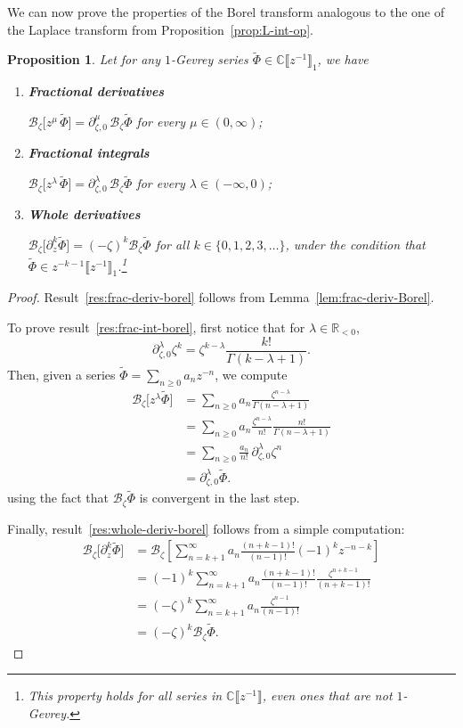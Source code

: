 \documentclass{article}
\newcommand{\R}{\mathbb{R}}
\newcommand{\C}{\mathbb{C}}
\newcommand{\series}[1]{\tilde{#1}}
\newcommand{\fracderiv}[3]{\partial^{#1}_{#2, #3}}
\newcommand{\borel}{\mathcal{B}}
\theoremstyle{definition}
\theoremstyle{plain}
\newtheorem{prop}[definition]{Proposition}
\begin{document}
We can now prove the properties of the Borel transform analogous to the one of the Laplace transform from Proposition~\ref{prop:L-int-op}.
\begin{prop}\label{prop:frac-der-int-borel}
Let for any $1$-Gevrey series $\series{\Phi}\in\C\llbracket z^{-1}\rrbracket_1$, we have
\begin{enumerate}[label=(\roman*)]
\item\label{res:frac-deriv-borel} \textbf{Fractional derivatives}

$\borel_\zeta\big[ z^\mu \, \series{\Phi}\big]=\fracderiv{\mu}{\zeta}{0}\, \borel_\zeta\series{\Phi}$ for every $\mu\in(0, \infty)$;
\item\label{res:frac-int-borel} \textbf{Fractional integrals}

$\borel_\zeta\big[z^\lambda\, \series{\Phi}\big]=\fracderiv{\lambda}{\zeta}{0}\,\borel_\zeta\series{\Phi}$ for every $\lambda\in(-\infty, 0)$;
\item\label{res:whole-deriv-borel} \textbf{Whole derivatives}

$\borel_\zeta\big[\partial_z^{k} \series{\Phi}\big]=(-\zeta)^k\borel_\zeta\series{\Phi}$ for all $k\in\{0, 1, 2, 3, \ldots\}$, under the condition that $\series{\Phi}\in z^{-k-1}\llbracket z^{-1}\rrbracket_1$.\footnote{This property holds for all series in $\C\llbracket z^{-1}\rrbracket$, even ones that are not $1$-Gevrey.}
\end{enumerate} 
\end{prop}
\begin{proof} 
Result~\ref{res:frac-deriv-borel} follows from Lemma~\ref{lem:frac-deriv-Borel}. 

To prove result~\ref{res:frac-int-borel}, first notice that for $\lambda \in \R_{< 0}$,
\[\fracderiv{\lambda}{\zeta}{0}\zeta^{k}=\zeta^{k-\lambda}\frac{k!}{\Gamma(k-\lambda+1)}.\] 
Then, given a series $\series{\Phi} = \sum_{n\geq 0} a_n z^{-n}$, we compute
\begin{align*}
\borel_\zeta \big[z^\lambda \series{\Phi}\big] & = \sum_{n\geq 0}a_n\frac{\zeta^{n-\lambda}}{\Gamma(n-\lambda+1)} \\
& = \sum_{n\geq 0}a_n\frac{\zeta^{n-\lambda}}{n!}\frac{n!}{\Gamma(n-\lambda+1)} \\
& = \sum_{n\geq 0} \frac{a_n}{n!}\,\fracderiv{\lambda}{\zeta}{0}\zeta^n \\
& = \fracderiv{\lambda}{\zeta}{0}\series{\Phi}.
\end{align*}
using the fact that $\borel_\zeta\series{\Phi}$ is convergent in the last step.

Finally, result~\ref{res:whole-deriv-borel} follows from a simple computation: 
\begin{align*}
\borel_\zeta\big[\partial_z^k\series{\Phi}\big]&=\borel_\zeta\left[\sum_{n=k+1}^\infty a_n \frac{(n+k-1)!}{(n-1)!} (-1)^{k} z^{-n-k}\right]\\
&=(-1)^k \sum_{n=k+1}^\infty a_n \frac{(n+k-1)!}{(n-1)!}\frac{\zeta^{n+k-1}}{(n+k-1)!}\\
&=(-\zeta)^k\sum_{n=k+1}^\infty a_n \frac{\zeta^{n-1}}{(n-1)!}\\
&=(-\zeta)^k\borel_\zeta \series{\Phi}.
\end{align*}
\end{proof}
%
\end{document}
